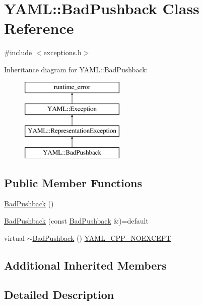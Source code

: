 \hypertarget{class_y_a_m_l_1_1_bad_pushback}{}\section{Y\+A\+ML\+::Bad\+Pushback Class Reference}
\label{class_y_a_m_l_1_1_bad_pushback}


{\ttfamily \#include $<$exceptions.\+h$>$}

Inheritance diagram for Y\+A\+ML\+::Bad\+Pushback\+:\begin{figure}[H]
\begin{center}
\leavevmode
\includegraphics[height=4.000000cm]{class_y_a_m_l_1_1_bad_pushback}
\end{center}
\end{figure}
\subsection*{Public Member Functions}
\begin{DoxyCompactItemize}
\item 
\mbox{\hyperlink{class_y_a_m_l_1_1_bad_pushback_a8d7239482e6e77b1ae3c8a48170259ca}{Bad\+Pushback}} ()
\item 
\mbox{\hyperlink{class_y_a_m_l_1_1_bad_pushback_ae3d57117a3a6bd7a9605cba8f59ad005}{Bad\+Pushback}} (const \mbox{\hyperlink{class_y_a_m_l_1_1_bad_pushback}{Bad\+Pushback}} \&)=default
\item 
virtual \mbox{\hyperlink{class_y_a_m_l_1_1_bad_pushback_a849f9d07f9b4ba8b023c851e090c9ed9}{$\sim$\+Bad\+Pushback}} () \mbox{\hyperlink{exceptions_8cpp_a4ea58eb0a28000364858d4942add7d1a}{Y\+A\+M\+L\+\_\+\+C\+P\+P\+\_\+\+N\+O\+E\+X\+C\+E\+PT}}
\end{DoxyCompactItemize}
\subsection*{Additional Inherited Members}


\subsection{Detailed Description}


